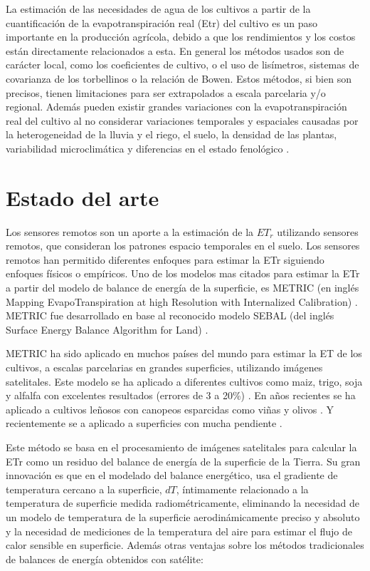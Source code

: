 \documentclass[]{article}
\begin{document}
La estimación de las necesidades de agua de los cultivos a partir de la cuantificación de la evapotranspiración real (Etr) del cultivo es un paso importante en la producción agrícola, debido a que los rendimientos y los costos están directamente relacionados a esta. En general los métodos usados son de carácter local, como los coeficientes de cultivo, o el uso de lisímetros, sistemas de covarianza de los torbellinos o la relación de Bowen. Estos métodos, si bien son precisos, tienen limitaciones para ser extrapolados a escala parcelaria y/o regional. Además pueden existir grandes variaciones con la evapotranspiración real del cultivo al no considerar variaciones temporales y espaciales causadas por la heterogeneidad de la lluvia y el riego, el suelo, la densidad de las plantas, variabilidad microclimática y diferencias en el estado fenológico \citep{Allen2011}. 

\section{Estado del arte}

Los sensores remotos son un aporte a la estimación de la $ET_r$ utilizando sensores remotos, que consideran los patrones espacio temporales en el suelo. Los sensores remotos han permitido diferentes enfoques para estimar la ETr siguiendo enfoques físicos o empíricos. Uno de los modelos mas citados para estimar la ETr a partir del modelo de balance de energía de la superficie, es METRIC (en inglés Mapping EvapoTranspiration at high Resolution with Internalized Calibration) \citep{Allen2007a}. METRIC fue desarrollado en base al reconocido modelo SEBAL (del inglés Surface Energy Balance Algorithm for Land) \citep{Bastiaanssen1998a, Bastiaanssen1998b}. 

METRIC ha sido aplicado en muchos países del mundo para estimar la ET de los cultivos, a escalas parcelarias en grandes superficies, utilizando imágenes satelitales. Este modelo se ha aplicado a diferentes cultivos como maiz, trigo, soja y alfalfa con excelentes resultados (errores de 3 a 20\%) \citep{Allen2007b, Choi2009, Mkhwanazi2012}. En años recientes se ha aplicado a cultivos leñosos con canopeos esparcidas como viñas y olivos \citep{Poblete-Echeverria2012, Carrasco-Benavides2014, Santos2012, Pocas2014}. Y recientemente se a aplicado a superficies con mucha pendiente \citep{Allen2013}.

Este método se basa en el procesamiento de imágenes satelitales para calcular la ETr como un residuo del balance de energía de la superficie de la Tierra. Su gran innovación es que en el modelado del balance energético, usa el gradiente de temperatura cercano a la superficie, $dT$, íntimamente relacionado a la temperatura de superficie medida radiométricamente, eliminando la necesidad de un modelo de temperatura de la superficie aerodinámicamente preciso y absoluto y la necesidad de mediciones de la temperatura del aire para estimar el flujo de calor sensible en superficie. Además otras ventajas sobre los métodos tradicionales de balances de energía obtenidos con satélite: 
\end{document}
